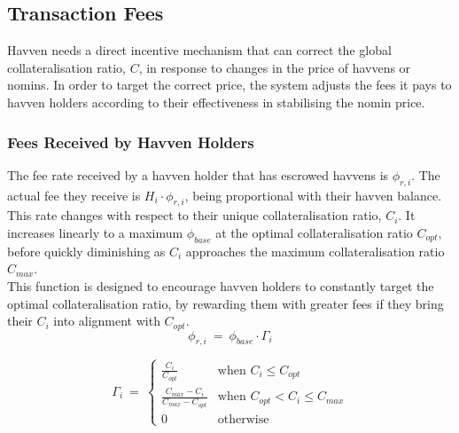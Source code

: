 \subsection{Transaction Fees}
Havven needs a direct incentive mechanism that can correct the global
collateralisation ratio, \(C\), in response to changes in the price of havvens
or nomins. In order to target the correct price, the system adjusts the fees
it pays to havven holders according to their effectiveness in stabilising
the nomin price.

\subsubsection{Fees Received by Havven Holders}

\noindent The fee rate received by a havven holder that has escrowed havvens is
\(\phi_{r,i}\). The actual fee they receive is \(H_i \cdot \phi_{r,i}\), being
proportional with their havven balance. This rate changes with respect to
their unique collateralisation ratio, \(C_i\). It increases linearly to a
maximum \(\phi_{base}\) at the optimal collateralisation ratio \(C_{opt}\),
before quickly diminishing as \(C_i\) approaches the maximum collateralisation
ratio \(C_{max}\). \\

\noindent This function is designed to encourage havven holders to constantly
target the optimal collateralisation ratio, by rewarding them with greater
fees if they bring their \(C_i\) into alignment with \(C_{opt}\).\\

\begin{equation}
\phi_{r,i} \ = \ \phi_{base} \cdot \mathit{\Gamma}_{i}  \label{eq:feesreceived}
\end{equation}

\begin{equation}
\mathit{\Gamma}_{i} \ = \
\begin{cases}
 \frac{C_{i}}{C_{opt}} &\mbox{when } C_{i} \leq C_{opt} \\[1em]
 \frac{C_{max} - C_{i}}{C_{max} - C_{opt}} &\mbox{when } C_{opt} < C_{i} \leq C_{max} \\[1em]
 0 &\mbox{otherwise}
 \end{cases}
 \label{eq:7}
\end{equation}

\begin{center}
\end{center}

